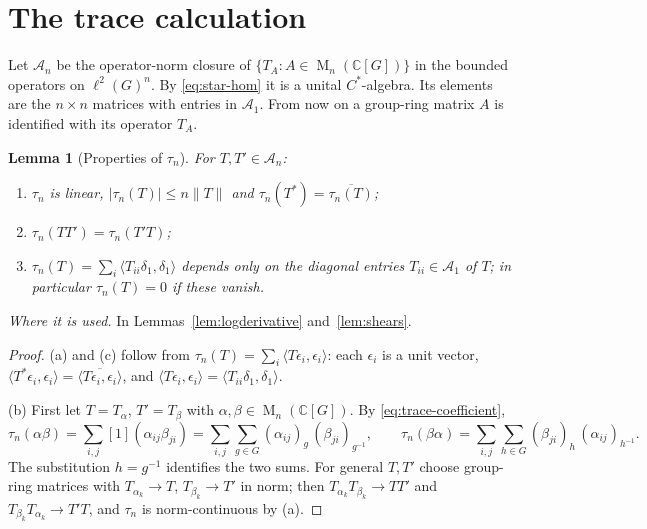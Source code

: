 \documentclass[11pt]{article}
\newtheorem{lemma}[theorem]{Lemma}
\theoremstyle{remark}
\numberwithin{equation}{section}
\newcommand{\C}{\mathbb C}
\newcommand{\Mat}{\operatorname{M}}
\begin{document}
\section{The trace calculation}
\label{sec:analysis}

Let $\mathcal A_n$ be the operator-norm closure of $\{T_A:A\in\Mat_n(\C[G])\}$ in the bounded operators on $\ell^2(G)^n$. By \eqref{eq:star-hom} it is a unital $C^*$-algebra. Its elements are the $n\times n$ matrices with entries in $\mathcal A_1$. From now on a group-ring matrix $A$ is identified with its operator $T_A$.

\begin{lemma}[Properties of $\tau_n$]\label{lem:trace}
For $T,T'\in\mathcal A_n$:
\begin{enumerate}[label=\textup{(\alph*)},leftmargin=2.2em]
\item $\tau_n$ is linear, $|\tau_n(T)|\le n\|T\|$ and $\tau_n(T^*)=\overline{\tau_n(T)}$;
\item $\tau_n(TT')=\tau_n(T'T)$;
\item $\tau_n(T)=\sum_i\langle T_{ii}\delta_1,\delta_1\rangle$ depends only on the diagonal entries $T_{ii}\in\mathcal A_1$ of $T$; in particular $\tau_n(T)=0$ if these vanish.
\end{enumerate}
\end{lemma}

\noindent\emph{Where it is used.} In Lemmas~\ref{lem:logderivative} and~\ref{lem:shears}.

\begin{proof}
(a) and (c) follow from $\tau_n(T)=\sum_i\langle T\epsilon_i,\epsilon_i\rangle$: each $\epsilon_i$ is a unit vector, $\langle T^*\epsilon_i,\epsilon_i\rangle=\overline{\langle T\epsilon_i,\epsilon_i\rangle}$, and $\langle T\epsilon_i,\epsilon_i\rangle=\langle T_{ii}\delta_1,\delta_1\rangle$.

(b) First let $T=T_\alpha$, $T'=T_\beta$ with $\alpha,\beta\in\Mat_n(\C[G])$. By \eqref{eq:trace-coefficient},
\[
 \tau_n(\alpha\beta)=\sum_{i,j}[1](\alpha_{ij}\beta_{ji})=\sum_{i,j}\sum_{g\in G}(\alpha_{ij})_g\,(\beta_{ji})_{g^{-1}},
 \qquad
 \tau_n(\beta\alpha)=\sum_{i,j}\sum_{h\in G}(\beta_{ji})_h\,(\alpha_{ij})_{h^{-1}} .
\]
The substitution $h=g^{-1}$ identifies the two sums. For general $T,T'$ choose group-ring matrices with $T_{\alpha_k}\to T$, $T_{\beta_k}\to T'$ in norm; then $T_{\alpha_k}T_{\beta_k}\to TT'$ and $T_{\beta_k}T_{\alpha_k}\to T'T$, and $\tau_n$ is norm-continuous by (a).
\end{proof}
\end{document}
